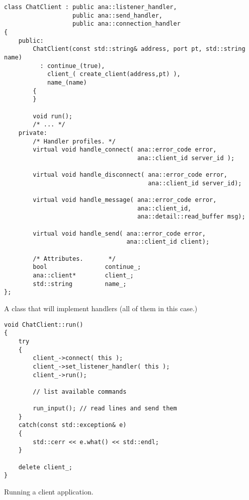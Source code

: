 \documentclass[a4paper,12pt,english]{article}
\begin{document}
\begin{table}[!htb]
\lstset{language=C++}
\begin{lstlisting}[frame=single]
class ChatClient : public ana::listener_handler,
                   public ana::send_handler,
                   public ana::connection_handler
{
    public:
        ChatClient(const std::string& address, port pt, std::string name)
          : continue_(true),
            client_( create_client(address,pt) ),
            name_(name)
        {
        }
        
        void run();
        /* ... */
    private:
        /* Handler profiles. */
        virtual void handle_connect( ana::error_code error, 
                                     ana::client_id server_id );

        virtual void handle_disconnect( ana::error_code error, 
                                        ana::client_id server_id);

        virtual void handle_message( ana::error_code error, 
                                     ana::client_id, 
                                     ana::detail::read_buffer msg);

        virtual void handle_send( ana::error_code error, 
                                  ana::client_id client);

        /* Attributes.       */
        bool                continue_;
        ana::client*        client_;
        std::string         name_;
};
\end{lstlisting}
\centering \caption{A class that will implement handlers (all of them in this case.)} 
\label{chatclient-decl}
\end{table}

\begin{table}[!htb]
\lstset{language=C++}
\begin{lstlisting}[frame=single]
void ChatClient::run()
{
    try
    {
        client_->connect( this );
        client_->set_listener_handler( this );
        client_->run();

        // list available commands

        run_input(); // read lines and send them
    }
    catch(const std::exception& e)
    {
        std::cerr << e.what() << std::endl;
    }

    delete client_;
}
\end{lstlisting}
\centering \caption{Running a client application.} 
\label{client-run}
\end{table}
\end{document}
